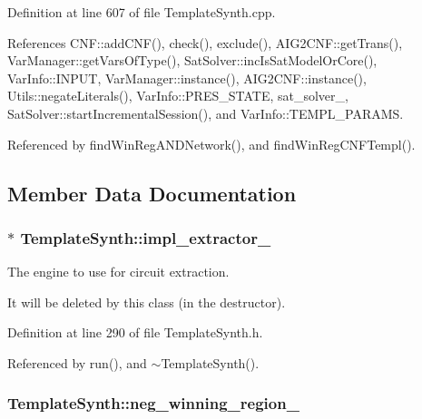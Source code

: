 Definition at line 607 of file Template\-Synth.\-cpp.



References C\-N\-F\-::add\-C\-N\-F(), check(), exclude(), A\-I\-G2\-C\-N\-F\-::get\-Trans(), Var\-Manager\-::get\-Vars\-Of\-Type(), Sat\-Solver\-::inc\-Is\-Sat\-Model\-Or\-Core(), Var\-Info\-::\-I\-N\-P\-U\-T, Var\-Manager\-::instance(), A\-I\-G2\-C\-N\-F\-::instance(), Utils\-::negate\-Literals(), Var\-Info\-::\-P\-R\-E\-S\-\_\-\-S\-T\-A\-T\-E, sat\-\_\-solver\-\_\-, Sat\-Solver\-::start\-Incremental\-Session(), and Var\-Info\-::\-T\-E\-M\-P\-L\-\_\-\-P\-A\-R\-A\-M\-S.



Referenced by find\-Win\-Reg\-A\-N\-D\-Network(), and find\-Win\-Reg\-C\-N\-F\-Templ().



\subsection{Member Data Documentation}
\hypertarget{classTemplateSynth_acfa25deb001fb3b6d49c0261bba98347}{
\subsubsection[{impl\-\_\-extractor\-\_\-}]{$\ast$ Template\-Synth\-::impl\-\_\-extractor\-\_\-\hspace{0.3cm}{\ttfamily [protected]}}}\label{classTemplateSynth_acfa25deb001fb3b6d49c0261bba98347}


The engine to use for circuit extraction. 

It will be deleted by this class (in the destructor). 

Definition at line 290 of file Template\-Synth.\-h.



Referenced by run(), and $\sim$\-Template\-Synth().

\hypertarget{classTemplateSynth_a49665461c82781b823b3da04057fdab2}{
\subsubsection[{neg\-\_\-winning\-\_\-region\-\_\-}]{ Template\-Synth\-::neg\-\_\-winning\-\_\-region\-\_\-\hspace{0.3cm}{\ttfamily [protected]}}}\label{classTemplateSynth_a49665461c82781b823b3da04057fdab2}


